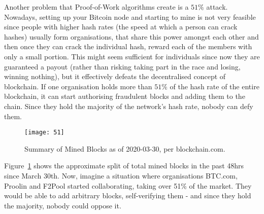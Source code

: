 Another problem that Proof-of-Work algorithms create is a $51\%$ attack. Nowadays, setting up your Bitcoin node and starting to mine is not very feasible since people with higher hash rates (the speed at which a person can crack hashes) usually form organisations, that share this power amongst each other and then once they can crack the individual hash, reward each of the members with only a small portion. This might seem sufficient for individuals since now they are guaranteed a payout (rather than risking taking part in the race and losing, winning nothing), but it effectively defeats the decentralised concept of blockchain. If one organisation holds more than $51\%$ of the hash rate of the entire blockchain, it can start authorising fraudulent blocks and adding them to the chain. Since they hold the majority of the network's hash rate, nobody can defy them. 

\begin{figure}[h]
    \centering
    \texttt{[image: 51]}
    \caption{Summary of Mined Blocks as of 2020-03-30, per blockchain.com.}
    \label{fig:51}
\end{figure}

Figure~\ref{fig:51} shows the approximate split of total mined blocks in the past 48hrs since March 30th. Now, imagine a situation where organisations BTC.com, Proolin and F2Pool started collaborating, taking over 51\% of the market. They would be able to add arbitrary blocks, self-verifying them - and since they hold the majority, nobody could oppose it.
